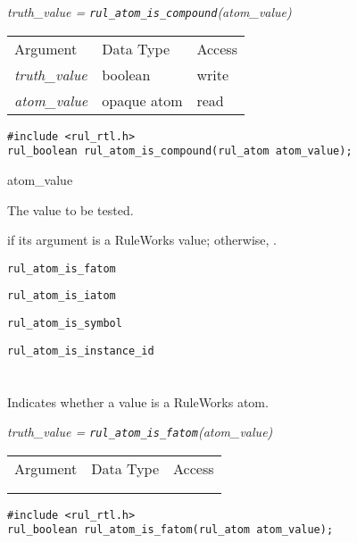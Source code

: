 \it{truth\_value} = \verb|rul_atom_is_compound|(\it{atom\_value})

\newenvironment{args}
  {\begin{tabular}{lll}Argument & Data Type & Access\\}
  {\end{tabular}}

\begin{args}
\it{truth\_value} & boolean & write \\
\it{atom\_value}  & opaque atom & read \\
\end{args}

\CBinding

\begin{verbatim}
#include <rul_rtl.h>
rul_boolean rul_atom_is_compound(rul_atom atom_value);
\end{verbatim}

\begin{argument}
\item[atom\_value]
  
  The value to be tested.
\end{argument}

\ReturnValue

 if its argument is a RuleWorks  value;
otherwise, .

\begin{seealso}
  \verb|rul_atom_is_fatom|

  \verb|rul_atom_is_iatom|
  
  \verb|rul_atom_is_symbol|
  
  \verb|rul_atom_is_instance_id|
\end{seealso}

\section*{}

Indicates whether a value is a RuleWorks  atom.

\Syntax

\it{truth\_value} = \verb|rul_atom_is_fatom|(\it{atom\_value})

\begin{args}
  \argl{truth\_value}{boolean}{write} \\
  \argl{atom\_value}{opaque atom}{read}
\end{args}

\CBinding
\begin{verbatim}
#include <rul_rtl.h>
rul_boolean rul_atom_is_fatom(rul_atom atom_value);
\end{verbatim}

